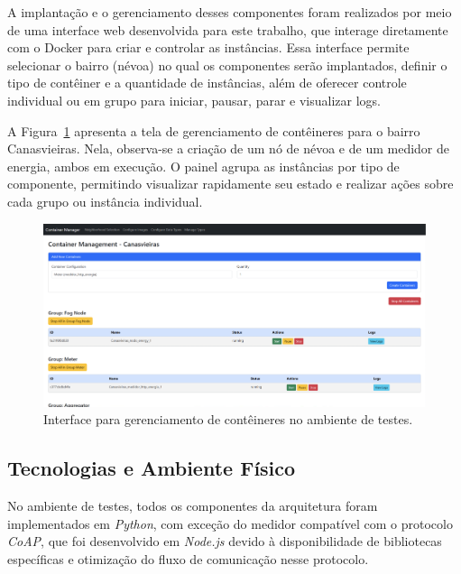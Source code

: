 A implantação e o gerenciamento desses componentes foram realizados por meio de uma interface web desenvolvida para este trabalho, que interage diretamente com o Docker para criar e controlar as instâncias. Essa interface permite selecionar o bairro (névoa) no qual os componentes serão implantados, definir o tipo de contêiner e a quantidade de instâncias, além de oferecer controle individual ou em grupo para iniciar, pausar, parar e visualizar logs.

A Figura~\ref{fig:container_manager} apresenta a tela de gerenciamento de contêineres para o bairro Canasvieiras. Nela, observa-se a criação de um nó de névoa e de um medidor de energia, ambos em execução. O painel agrupa as instâncias por tipo de componente, permitindo visualizar rapidamente seu estado e realizar ações sobre cada grupo ou instância individual.

\begin{figure}[htb]
    \caption{\label{fig:container_manager}Interface para gerenciamento de contêineres no ambiente de testes.}
    \begin{center}
        \includegraphics[width=1\linewidth]{images/container_manager.png}
    \end{center}
\end{figure}

\subsection{Tecnologias e Ambiente Físico}

No ambiente de testes, todos os componentes da arquitetura foram implementados em \textit{Python}, com exceção do medidor compatível com o protocolo \textit{CoAP}, que foi desenvolvido em \textit{Node.js} devido à disponibilidade de bibliotecas específicas e otimização do fluxo de comunicação nesse protocolo.

